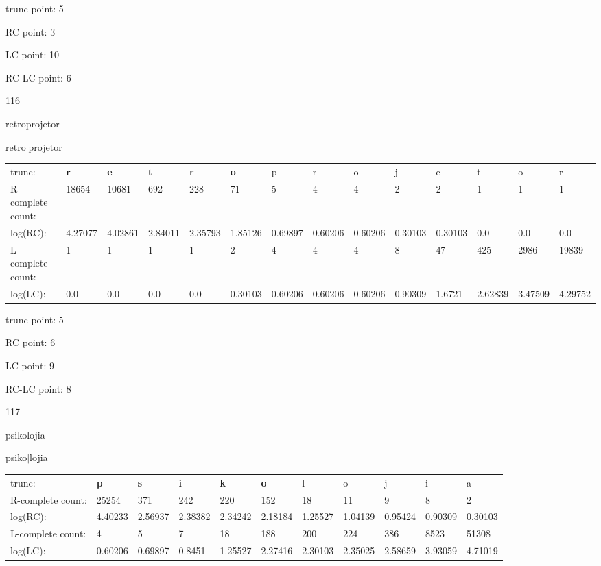 \documentclass{article}
\begin{document}
trunc point: 5

RC point: 3

LC point: 10

RC-LC point: 6

\vspace{3em}



116

retroprojetor

retro$|$projetor

\vspace{1em}

\begin{tabular}{l|lllllllllllll}

trunc: & {\color{red}\bf r} & {\color{red}\bf e} & {\color{red}\bf t} & {\color{red}\bf r} & {\color{red}\bf o} & p & r & o & j & e & t & o & r \\ 
R-complete count: & 18654 & 10681 & 692 & 228 & 71 & 5 & 4 & 4 & 2 & 2 & 1 & 1 & 1 \\ 
log(RC): & 4.27077 & 4.02861 & 2.84011 & 2.35793 & 1.85126 & 0.69897 & 0.60206 & 0.60206 & 0.30103 & 0.30103 & 0.0 & 0.0 & 0.0 \\ 
L-complete count: & 1 & 1 & 1 & 1 & 2 & 4 & 4 & 4 & 8 & 47 & 425 & 2986 & 19839 \\ 
log(LC): & 0.0 & 0.0 & 0.0 & 0.0 & 0.30103 & 0.60206 & 0.60206 & 0.60206 & 0.90309 & 1.6721 & 2.62839 & 3.47509 & 4.29752 \\ 
\end{tabular}

trunc point: 5

RC point: 6

LC point: 9

RC-LC point: 8

\vspace{3em}



117

psikolojia

psiko$|$lojia

\vspace{1em}

\begin{tabular}{l|llllllllll}

trunc: & {\color{red}\bf p} & {\color{red}\bf s} & {\color{red}\bf i} & {\color{red}\bf k} & {\color{red}\bf o} & l & o & j & i & a \\ 
R-complete count: & 25254 & 371 & 242 & 220 & 152 & 18 & 11 & 9 & 8 & 2 \\ 
log(RC): & 4.40233 & 2.56937 & 2.38382 & 2.34242 & 2.18184 & 1.25527 & 1.04139 & 0.95424 & 0.90309 & 0.30103 \\ 
L-complete count: & 4 & 5 & 7 & 18 & 188 & 200 & 224 & 386 & 8523 & 51308 \\ 
log(LC): & 0.60206 & 0.69897 & 0.8451 & 1.25527 & 2.27416 & 2.30103 & 2.35025 & 2.58659 & 3.93059 & 4.71019 \\ 
\end{tabular}
\end{document}
